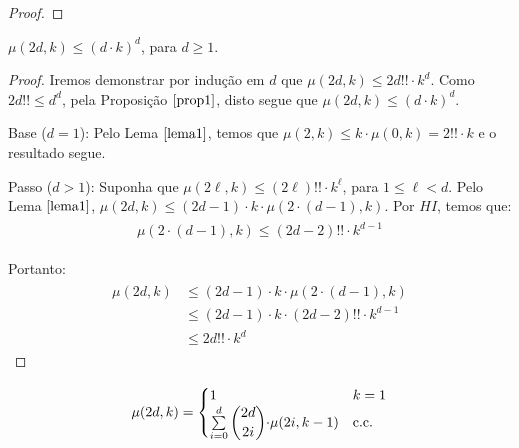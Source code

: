 \documentclass[12pt]{article}
\begin{document}
{\begin{proof}
 \end{proof} \newl
 
 
  \begin{lema}  
 	\label{lema2} 
 	$\mu(2d, k) \leq (d {\cdot} k)^d$, para $d \geq 1$.
 \end{lema}
 
 \begin{proof} Iremos demonstrar por indução em $d$ que $\mu(2d, k) \leq 2d!! \cdot k^d$. Como $2d!! \leq d^d$, pela Proposição $\ref{prop1}$, disto segue que $\mu(2d, k) \leq (d {\cdot} k)^d$. 
 	
 	Base ($d = 1$): Pelo Lema $\ref{lema1}$, temos que $\mu(2, k) \leq k \cdot \mu(0, k)= 2!! \cdot k$ e o resultado segue.
 	
 	Passo ($d > 1$): Suponha que $\mu(2\ell, k) \leq (2\ell)!! \cdot k^{\ell}$, para $1 \leq \ell < d$. Pelo Lema $\ref{lema1}$, $\mu(2d, k) \leq (2d - 1) \cdot k \cdot \mu(2 {\cdot} (d - 1), k)$. Por $HI$, temos que: 
 	\begin{align}
 		\begin{split}
			\mu(2 {\cdot} (d - 1), k) \leq (2d - 2)!! \cdot k^{d-1}
 		\end{split} 
 	\end{align} 
 	
 	Portanto: 
 	\begin{align}
 		\begin{split}
 			\mu(2d, k) &\leq (2d - 1) \cdot k \cdot \mu(2 {\cdot} (d - 1), k) \\
 			&\leq (2d - 1) \cdot k \cdot (2d - 2)!! \cdot k^{d-1} \\
 			&\leq 2d!! \cdot k^d
 		\end{split} 
 	\end{align} 
 	
 \end{proof} \newl
 
 
\begin{lema}   
	\label{lema3}
	\begin{equation}
		\mu(2d, k) =
		\begin{cases}
			1 & \text{$k = 1$} \\
			\sum\limits_{i = 0}^{d} \escolhe{2d}{2i} {\cdot} \mu(2i, k-1) & \text{c.c.} \\ 
		\end{cases}
	\end{equation} 
\end{lema}
 
}
\end{document}
